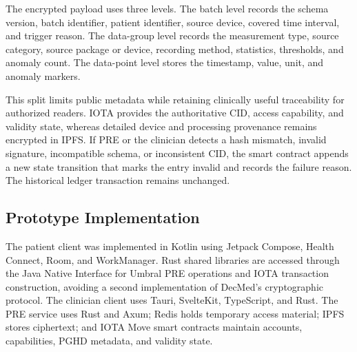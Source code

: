 The encrypted payload uses three levels.
The batch level records the schema version, batch identifier, patient identifier, source device, covered time interval, and trigger reason.
The data-group level records the measurement type, source category, source package or device, recording method, statistics, thresholds, and anomaly count.
The data-point level stores the timestamp, value, unit, and anomaly markers.

This split limits public metadata while retaining clinically useful traceability for authorized readers.
IOTA provides the authoritative CID, access capability, and validity state, whereas detailed device and processing provenance remains encrypted in IPFS.
If PRE or the clinician detects a hash mismatch, invalid signature, incompatible schema, or inconsistent CID, the smart contract appends a new state transition that marks the entry invalid and records the failure reason.
The historical ledger transaction remains unchanged.

\subsection{Prototype Implementation}

The patient client was implemented in Kotlin using Jetpack Compose, Health Connect, Room, and WorkManager.
Rust shared libraries are accessed through the Java Native Interface for Umbral PRE operations and IOTA transaction construction, avoiding a second implementation of DecMed's cryptographic protocol.
The clinician client uses Tauri, SvelteKit, TypeScript, and Rust.
The PRE service uses Rust and Axum; Redis holds temporary access material; IPFS stores ciphertext; and IOTA Move smart contracts maintain accounts, capabilities, PGHD metadata, and validity state.
